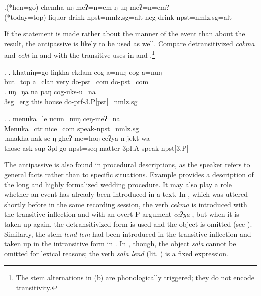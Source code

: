 	\exg.\label{ex-raksi}(*hen=go) chemha uŋ-meʔ=n=em ŋ-uŋ-meʔ=n=em? \\
(*today{\sc =top}) liquor  drink{\sc [3sg]-npst=nmlz.sg=alt} {\sc neg-}drink{\sc [3sg]-npst=nmlz.sg=alt}\\

If the statement is made rather about the manner of the event than about the result, the antipassive is likely to be used as well. Compare detransitivized \emph{cokma}  and \emph{cekt}  in \Next[a] and  \NNext[a] with the transitive uses in  \Next[b] and \NNext[b].\footnote{The stem alternations in (b) are phonologically triggered; they do not encode transitivity.}

\ex. \ag. khatniŋ=go liŋkha ekdam cog-a=nuŋ cog-a=nuŋ\\
but{\sc =top} a\_clan  very do{\sc [3sg]-pst=com} do{\sc [3sg]-pst=com}\\
 
\bg. uŋ=ŋa na paŋ cog-uks-u=na\\
   {\sc 3sg=erg} this house   do{\sc -prf-3.P[pst]=nmlz.sg}\\

\ex. \ag. menuka=le ucun=nuŋ ceŋ-meʔ=na\\
Menuka{\sc =ctr} nice{\sc =com} speak{\sc [3sg]-npst=nmlz.sg}\\
\bg.nnakha nak-se            ŋ-gheʔ-me=hoŋ          ceʔya n-jekt-wa\\
		those ask{\sc -sup} {\sc 3pl-}go{\sc -npst=seq}	matter	{\sc 3pl.A-}speak{\sc -npst[3.P]}\\
	 


The antipassive is also found in procedural descriptions, as the speaker refers to general facts rather than to specific situations. Example \Next[a] provides  a description of the long and highly formalized wedding procedure. It may also play a role whether an event has  already been introduced in a text. In \Last[b], which was uttered shortly before \Next[a] in the same recording session, the verb \emph{cekma}  is introduced with the transitive inflection and with an overt P argument \emph{ceʔya} , but when it is taken up again, the detransitivized form is used and the object is omitted (see \Next[a]). Similarly, the stem \emph{lend \ti lem}  had been introduced in the transitive inflection and taken up in the intransitive form in  \Next[a]. In \Next[b], though, the object  \emph{sala} cannot be omitted for lexical reasons; the verb \emph{sala lend}  (lit. ) is a  fixed expression.

